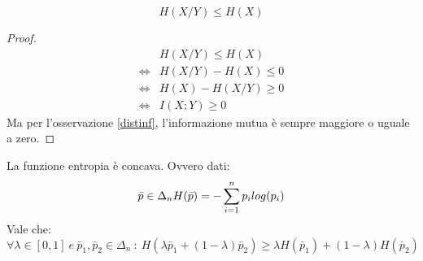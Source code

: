 \begin{osservazione}
 \[
  H(X/Y) \le H(X)
 \]
  \begin{proof}
   \[\begin{split}
     & H(X/Y) \le H(X) \\ 
     \iff & H(X/Y) -H(X) \le 0 \\
     \iff & H(X)-H(X/Y) \ge 0 \\
     \iff & I(X;Y) \ge 0
     \end{split}
   \]
  Ma per l'osservazione \ref{distinf}, l'informazione mutua è sempre maggiore o uguale a zero.
  \end{proof}

 \label{condizionamento}
\end{osservazione}

\begin{osservazione}
 La funzione entropia è concava. Ovvero dati:
 \[
 \bar{p} \in \Delta_n \\
 H(\bar{p})=-\sum_{i=1}^n p_i log(p_i)
 \]
 Vale che:
 \[
  \forall \lambda \in [0,1] \ e \ \bar{p}_1,\bar{p}_2 \in \Delta_n \ : \ 
   H(\lambda \bar{p}_1 + (1-\lambda) \bar{p}_2) \ge \lambda H(\bar{p}_1) + (1-\lambda) H(\bar{p}_2)
 \]


\end{osservazione}
